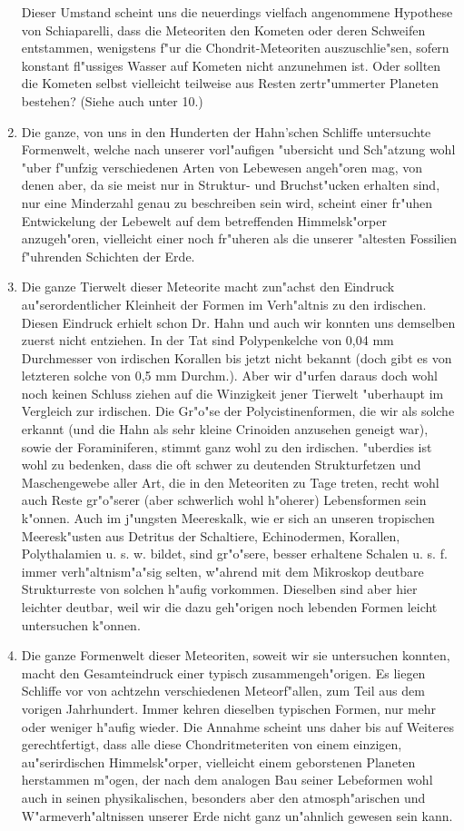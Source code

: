 \documentclass[a4paper, 11pt, oneside]{article}
\begin{document}
\begin{enumerate}
Dieser Umstand scheint uns die neuerdings vielfach angenommene Hypothese von Schiaparelli, dass die Meteoriten den Kometen oder deren Schweifen entstammen, wenigstens f"ur die Chondrit-Meteoriten auszuschlie"sen, sofern konstant fl"ussiges Wasser auf Kometen nicht anzunehmen ist. Oder sollten die Kometen selbst vielleicht teilweise aus Resten zertr"ummerter Planeten bestehen? (Siehe auch unter 10.)
\item Die ganze, von uns in den Hunderten der Hahn'schen Schliffe untersuchte Formenwelt, welche nach unserer vorl"aufigen "ubersicht und Sch"atzung wohl "uber f"unfzig verschiedenen Arten von Lebewesen angeh"oren mag, von denen aber, da sie meist nur in Struktur- und Bruchst"ucken erhalten sind, nur eine Minderzahl genau zu beschreiben sein wird, scheint einer fr"uhen Entwickelung der Lebewelt auf dem betreffenden Himmelsk"orper anzugeh"oren, vielleicht einer noch fr"uheren als die unserer "altesten Fossilien f"uhrenden Schichten der Erde.
\item Die ganze Tierwelt dieser Meteorite macht zun"achst den Eindruck au"serordentlicher Kleinheit der Formen im Verh"altnis zu den irdischen. Diesen Eindruck erhielt schon Dr. Hahn und auch wir konnten uns demselben zuerst nicht entziehen. In der Tat sind Polypenkelche von 0,04 mm Durchmesser von irdischen Korallen bis jetzt nicht bekannt (doch gibt es von letzteren solche von 0,5 mm Durchm.). Aber wir d"urfen daraus doch wohl noch keinen Schluss ziehen auf die Winzigkeit jener Tierwelt "uberhaupt im Vergleich zur irdischen. Die Gr"o"se der Polycistinenformen, die wir als solche erkannt (und die Hahn als sehr kleine Crinoiden anzusehen geneigt war), sowie der Foraminiferen, stimmt ganz wohl zu den irdischen. "uberdies ist wohl zu bedenken, dass die oft schwer zu deutenden Strukturfetzen und Maschengewebe aller Art, die in den Meteoriten zu Tage treten, recht wohl auch Reste gr"o"serer (aber schwerlich wohl h"oherer) Lebensformen sein k"onnen. Auch im j"ungsten Meereskalk, wie er sich an unseren tropischen Meeresk"usten aus Detritus der Schaltiere, Echinodermen, Korallen, Polythalamien u. s. w. bildet, sind gr"o"sere, besser erhaltene Schalen u. s. f. immer verh"altnism"a"sig selten, w"ahrend mit dem Mikroskop deutbare Strukturreste von solchen h"aufig vorkommen. Dieselben sind aber hier leichter deutbar, weil wir die dazu geh"origen noch lebenden Formen leicht untersuchen k"onnen.
\item Die ganze Formenwelt dieser Meteoriten, soweit wir sie untersuchen konnten, macht den Gesamteindruck einer typisch zusammengeh"origen. Es liegen Schliffe vor von achtzehn verschiedenen Meteorf"allen, zum Teil aus dem vorigen Jahrhundert. Immer kehren dieselben typischen Formen, nur mehr oder weniger h"aufig wieder. Die Annahme scheint uns daher bis auf Weiteres gerechtfertigt, dass alle diese Chondritmeteriten von einem einzigen, au"serirdischen Himmelsk"orper, vielleicht einem geborstenen Planeten herstammen m"ogen, der nach dem analogen Bau seiner Lebeformen wohl auch in seinen physikalischen, besonders aber den atmosph"arischen und W"armeverh"altnissen unserer Erde nicht ganz un"ahnlich gewesen sein kann.
\end{enumerate}
\end{document}
